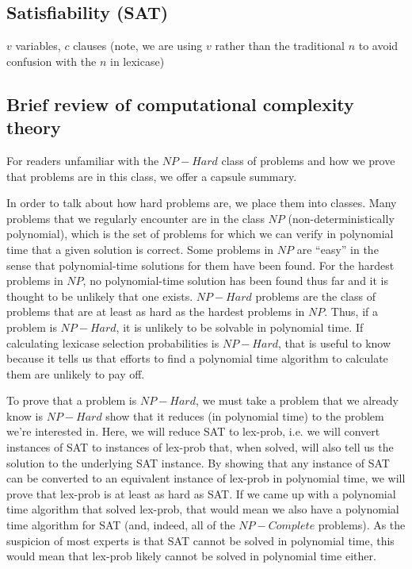 \documentclass[sigconf]{acmart}
\begin{document}

\subsection{Satisfiability ({\sc SAT})}

$v$ variables, $c$ clauses (note, we are using $v$ rather than the traditional $n$ to avoid confusion with the $n$ in lexicase)

\subsection{Brief review of computational complexity theory}

For readers unfamiliar with the $NP-Hard$ class of problems and how we prove that problems are in this class, we offer a capsule summary. 

In order to talk about how hard problems are, we place them into classes. Many problems that we regularly encounter are in the class $NP$ (non-deterministically polynomial), which is the set of problems for which we can verify in polynomial time that a given solution is correct. Some problems in $NP$ are ``easy'' in the sense that polynomial-time solutions for them have been found. For the hardest problems in $NP$, no polynomial-time solution has been found thus far and it is thought to be unlikely that one exists. $NP-Hard$ problems are the class of problems that are at least as hard as the hardest problems in $NP$. Thus, if a problem is $NP-Hard$, it is unlikely to be solvable in polynomial time. If calculating lexicase selection probabilities is $NP-Hard$, that is useful to know because it tells us that efforts to find a polynomial time algorithm to calculate them are unlikely to pay off.

To prove that a problem is $NP-Hard$, we must take a problem that we already know is $NP-Hard$ show that it reduces (in polynomial time) to the problem we're interested in.  Here, we will reduce {\sc SAT} to {\sc lex-prob}, i.e. we will convert instances of {\sc SAT} to instances of {\sc lex-prob} that, when solved, will also tell us the solution to the underlying {\sc SAT} instance. By showing that any instance of {\sc SAT} can be converted to an equivalent instance of {\sc lex-prob} in polynomial time, we will prove that {\sc lex-prob} is at least as hard as {\sc SAT}. If we came up with a polynomial time algorithm that solved {\sc lex-prob}, that would mean we also have a polynomial time algorithm for {\sc SAT} (and, indeed, all of the $NP-Complete$ problems). As the suspicion of most experts is that {\sc SAT} cannot be solved in polynomial time, this would mean that {\sc lex-prob} likely cannot be solved in polynomial time either.
\end{document}
